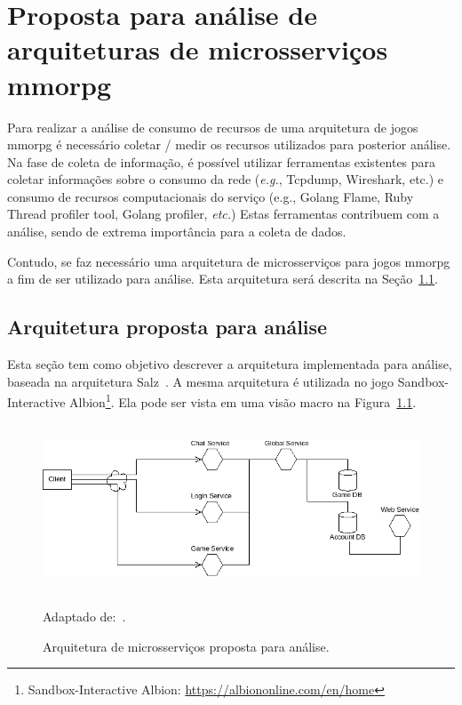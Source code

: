 \chapter{Proposta para análise de arquiteturas de microsserviços \ac{mmorpg}}
\label{cap3}

Para realizar a análise de consumo de recursos de uma arquitetura de jogos \ac{mmorpg} é necessário coletar / medir os recursos utilizados para posterior análise.
%
Na fase de coleta de informação, é possível utilizar ferramentas existentes para coletar informações sobre o consumo da rede (\textit{e.g.}, Tcpdump, Wireshark, etc.) e consumo de recursos computacionais do serviço (e.g., Golang Flame, Ruby Thread profiler tool, Golang profiler, \textit{etc.})
%
Estas ferramentas contribuem com a análise, sendo de extrema importância para a coleta de dados.



Contudo, se faz necessário uma arquitetura de microsserviços para jogos \ac{mmorpg} a fim de ser utilizado para análise.
%
Esta arquitetura será descrita na Seção~\ref{sec:arquitetura_proposta}.



\section{Arquitetura proposta para análise}
\label{sec:arquitetura_proposta}

Esta seção tem como objetivo descrever a arquitetura implementada para análise, baseada na arquitetura Salz~\cite{albion_online_unite}.
%
A mesma arquitetura é utilizada no jogo Sandbox-Interactive Albion\footnote{Sandbox-Interactive Albion: \url{https://albiononline.com/en/home}}.
%
Ela pode ser vista em uma visão macro na Figura~\ref{fig:salz}.


\begin{figure}[htb!]
\caption{Arquitetura de microsserviços proposta para análise.}
\label{fig:salz}
\includegraphics[height=5cm]{img/cap3/salz.png}
\centering

Adaptado de:~\cite{albion_online_unite}.
\end{figure}



